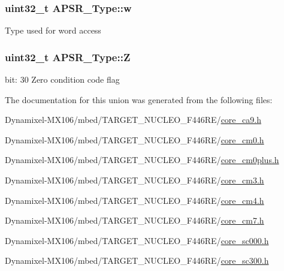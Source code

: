 \subsubsection[{\texorpdfstring{w}{w}}]{\setlength{\rightskip}{0pt plus 5cm}uint32\+\_\+t A\+P\+S\+R\+\_\+\+Type\+::w}\hypertarget{union_a_p_s_r___type_ae4c2ef8c9430d7b7bef5cbfbbaed3a94}{}\label{union_a_p_s_r___type_ae4c2ef8c9430d7b7bef5cbfbbaed3a94}
Type used for word access 
\subsubsection[{\texorpdfstring{Z}{Z}}]{\setlength{\rightskip}{0pt plus 5cm}uint32\+\_\+t A\+P\+S\+R\+\_\+\+Type\+::Z}\hypertarget{union_a_p_s_r___type_a3b04d58738b66a28ff13f23d8b0ba7e5}{}\label{union_a_p_s_r___type_a3b04d58738b66a28ff13f23d8b0ba7e5}
bit\+: 30 Zero condition code flag 

The documentation for this union was generated from the following files\+:\begin{DoxyCompactItemize}
\item 
Dynamixel-\/\+M\+X106/mbed/\+T\+A\+R\+G\+E\+T\+\_\+\+N\+U\+C\+L\+E\+O\+\_\+\+F446\+R\+E/\hyperlink{core__ca9_8h}{core\+\_\+ca9.\+h}\item 
Dynamixel-\/\+M\+X106/mbed/\+T\+A\+R\+G\+E\+T\+\_\+\+N\+U\+C\+L\+E\+O\+\_\+\+F446\+R\+E/\hyperlink{core__cm0_8h}{core\+\_\+cm0.\+h}\item 
Dynamixel-\/\+M\+X106/mbed/\+T\+A\+R\+G\+E\+T\+\_\+\+N\+U\+C\+L\+E\+O\+\_\+\+F446\+R\+E/\hyperlink{core__cm0plus_8h}{core\+\_\+cm0plus.\+h}\item 
Dynamixel-\/\+M\+X106/mbed/\+T\+A\+R\+G\+E\+T\+\_\+\+N\+U\+C\+L\+E\+O\+\_\+\+F446\+R\+E/\hyperlink{core__cm3_8h}{core\+\_\+cm3.\+h}\item 
Dynamixel-\/\+M\+X106/mbed/\+T\+A\+R\+G\+E\+T\+\_\+\+N\+U\+C\+L\+E\+O\+\_\+\+F446\+R\+E/\hyperlink{core__cm4_8h}{core\+\_\+cm4.\+h}\item 
Dynamixel-\/\+M\+X106/mbed/\+T\+A\+R\+G\+E\+T\+\_\+\+N\+U\+C\+L\+E\+O\+\_\+\+F446\+R\+E/\hyperlink{core__cm7_8h}{core\+\_\+cm7.\+h}\item 
Dynamixel-\/\+M\+X106/mbed/\+T\+A\+R\+G\+E\+T\+\_\+\+N\+U\+C\+L\+E\+O\+\_\+\+F446\+R\+E/\hyperlink{core__sc000_8h}{core\+\_\+sc000.\+h}\item 
Dynamixel-\/\+M\+X106/mbed/\+T\+A\+R\+G\+E\+T\+\_\+\+N\+U\+C\+L\+E\+O\+\_\+\+F446\+R\+E/\hyperlink{core__sc300_8h}{core\+\_\+sc300.\+h}\end{DoxyCompactItemize}
